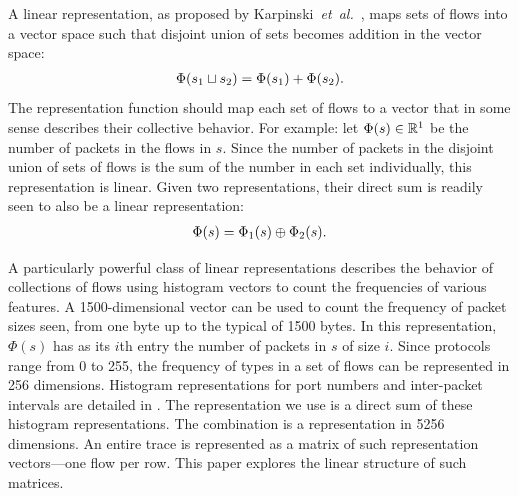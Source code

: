 \documentclass[conference]{IEEEtran}
\begin{document}
A linear representation, as proposed by Karpinski~\emph{et~al.}~\cite{Karpinski08}, maps sets of flows into a vector space such that disjoint union of sets becomes addition in the vector space:
\begin{align}
  \Phi(s_1 \sqcup s_2) = \Phi(s_1) + \Phi(s_2).
\end{align}
The representation function should map each set of flows to a vector that in some sense describes their collective behavior.
For example: let $\Phi(s) \in \mathbb{R}^1$ be the number of packets in the flows in $s$.
Since the number of packets in the disjoint union of sets of flows is the sum of the number in each set individually, this representation is linear.
Given two representations, their direct sum is readily seen to also be a linear representation:
\begin{align}
  \Phi(s) = \Phi_1(s) \oplus \Phi_2(s).
\end{align}

A particularly powerful class of linear representations describes the behavior of collections of flows using histogram vectors to count the frequencies of various features.
A 1500-dimensional vector can be used to count the frequency of packet sizes seen, from one byte up to the typical  of 1500 bytes.
In this representation, $\Phi(s)$ has as its $i$th entry the number of packets in $s$ of size $i$.
Since  protocols range from 0 to 255, the frequency of types in a set of flows can be represented in 256 dimensions.
Histogram representations for port numbers and inter-packet intervals are detailed in .
The representation we use is a direct sum of these histogram representations.
The combination is a representation in 5256 dimensions.
An entire trace is represented as a matrix of such representation vectors---one flow per row.
This paper explores the linear structure of such matrices.

\end{document}
